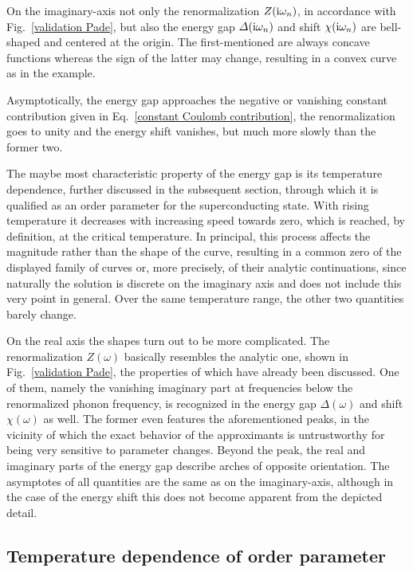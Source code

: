 On the imaginary-axis not only the renormalization $Z(\mathrm i \omega_n)$, in
accordance with Fig.~\ref{validation Pade}, but also the energy gap $\varDelta(\mathrm i
\omega_n)$ and shift $\chi(\mathrm i \omega_n)$ are bell-shaped and centered at the
origin. The first-mentioned are always concave functions whereas the sign of
the latter may change, resulting in a convex curve as in the example.

Asymptotically, the energy gap approaches the negative or vanishing constant
 contribution given in Eq.~\ref{constant Coulomb contribution},
the renormalization goes to unity and the energy shift vanishes, but much more
slowly than the former two.

The maybe most characteristic property of the energy gap is its temperature
dependence, further discussed in the subsequent section, through which it is
qualified as an order parameter for the superconducting state. With rising
temperature it decreases with increasing speed towards zero, which is reached,
by definition, at the critical temperature. In principal, this process affects
the magnitude rather than the shape of the curve, resulting in a common zero of
the displayed family of curves or, more precisely, of their analytic
continuations, since naturally the solution is discrete on the imaginary axis
and does not include this very point in general. Over the same temperature
range, the other two quantities barely change.

On the real axis the shapes turn out to be more complicated. The renormalization
$Z(\omega)$ basically resembles the analytic one, shown in Fig.~\ref{validation
Pade}, the properties of which have already been discussed. One of them, namely
the vanishing imaginary part at frequencies below the renormalized phonon
frequency, is recognized in the energy gap $\Delta(\omega)$ and shift
$\chi(\omega)$ as well. The former even features the aforementioned peaks, in
the vicinity of which the exact behavior of the  approximants is
untrustworthy for being very sensitive to parameter changes. Beyond the peak,
the real and imaginary parts of the energy gap describe arches of opposite
orientation. The asymptotes of all quantities are the same as on the
imaginary-axis, although in the case of the energy shift this does not become
apparent from the depicted detail.

\subsection{Temperature dependence of order parameter}
\label{temperature dependence of order parameter}

